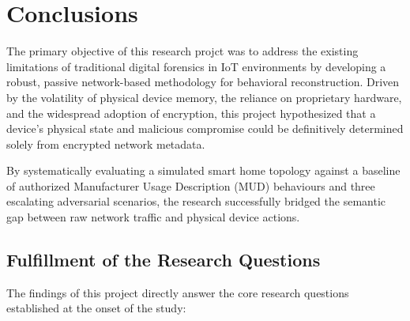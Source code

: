 \section{Conclusions}

The primary objective of this research projct was to address the existing limitations of traditional digital forensics in IoT environments by developing a robust, passive network-based methodology for behavioral reconstruction. Driven by the volatility of physical device memory, the reliance on proprietary hardware, and the widespread adoption of encryption, this project hypothesized that a device's physical state and malicious compromise could be definitively determined solely from encrypted network metadata. 

By systematically evaluating a simulated smart home topology against a baseline of authorized Manufacturer Usage Description (MUD) behaviours and three escalating adversarial scenarios, the research successfully bridged the semantic gap between raw network traffic and physical device actions.

\subsection{Fulfillment of the Research Questions}

The findings of this project directly answer the core research questions established at the onset of the study:

